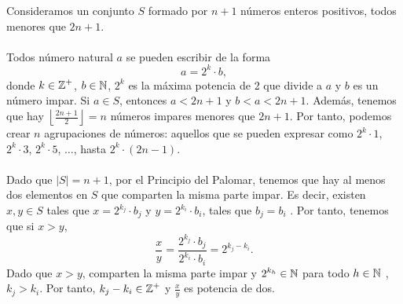 \documentclass{article}
\begin{document}
\begin{sol}
Consideramos un conjunto $\displaystyle S $ formado por $\displaystyle n + 1 $ números enteros positivos, todos menores que $\displaystyle 2n+1 $. \\ \\
Todos número natural $\displaystyle a $  se pueden escribir de la forma
\[a = 2^{k}\cdot b ,\]
donde $\displaystyle k \in \mathbb{Z}^{+} $, $\displaystyle b \in \mathbb{N} $, $\displaystyle 2^{k} $ es la máxima potencia de 2 que divide a $\displaystyle a $ y $\displaystyle b $ es un número impar. Si $\displaystyle a \in S $, entonces $\displaystyle a < 2n + 1 $ y $\displaystyle b < a < 2n+1 $. Además, tenemos que hay $\displaystyle \left\lfloor \frac{2n+1}{2} \right\rfloor=n $ números impares menores que $\displaystyle 2n+1 $. Por tanto, podemos crear $\displaystyle n $ agrupaciones de números: aquellos que se pueden expresar como $\displaystyle 2^{k}\cdot1 $, $\displaystyle 2^{k}\cdot 3 $, $\displaystyle 2^{k}\cdot5 $, $\displaystyle \ldots $, hasta $\displaystyle 2^{k}\cdot\left(2n-1\right) $. \\
\\
Dado que $\displaystyle \left|S\right|=n+1 $, por el Principio del Palomar, tenemos que hay al menos dos elementos en $\displaystyle S $ que comparten la misma parte impar. Es decir, existen $\displaystyle x,y \in S $ tales que $\displaystyle x = 2^{k_{j}}\cdot b_{j} $ y $\displaystyle y = 2^{k_{i}}\cdot b_{i} $, tales que $\displaystyle b_{j}=b_{i} $ . Por tanto, tenemos que si $\displaystyle x > y $, 
\[\frac{x}{y}=\frac{2^{k_{j}}\cdot b_{j}}{2^{k_{i}}\cdot b_{i}} = 2^{k_{j}-k_{i}}  .\]
Dado que $\displaystyle x>y $, comparten la misma parte impar y $\displaystyle 2^{k_{h}}\in\mathbb{N}$ para todo $\displaystyle h \in \mathbb{N} $ , $\displaystyle k_{j}>k_{i} $. Por tanto, $\displaystyle k_{j}-k_{i}\in\mathbb{Z}^{+} $ y $\displaystyle \frac{x}{y} $ es potencia de dos.
\end{sol}
\end{document}
